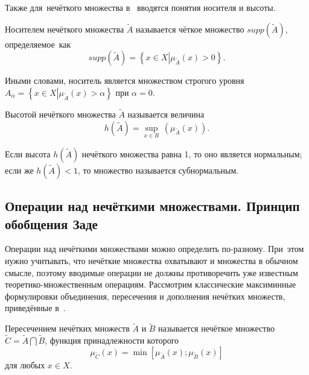 Также для~нечёткого множества в~\cite{Pospelov, Rutkovskaya, Yakhyaeva} вводятся понятия носителя и высоты.
\begin{mydef}
Носителем нечёткого множества $\tilde{A}$ называется чёткое множество $supp\left( {\tilde{A}} \right)$, определяемое~как
\begin{equation}
\label{eq:support}
	supp\left( \tilde A \right)=\left\{ x\in X \left| \mu_{\tilde A}\left( x \right)>0 \right. \right\}.
\end{equation}
\end{mydef}
Иными словами, носитель является множеством строгого уровня $A_\alpha= \left\{ x\in X \left| \mu_{\tilde A}\left( x \right)> \alpha \right. \right\}$ при $\alpha = 0$.

\begin{mydef}
Высотой нечёткого множества $\tilde A$ называется величина
\begin{equation}
\label{eq:number-height}
	h \left( \tilde A \right)= \underset{x\in R}{\mathop {\sup}} {}\, \left( \mu_{\tilde A} \left( x \right) \right).
\end{equation}
\end{mydef}
Если высота $h\left( \tilde A \right)$ нечёткого множества равна 1, то оно является нормальным; если же $h\left( \tilde A \right) < 1$, то множество называется субнормальным.

\subsection{Операции над нечёткими множествами. Принцип обобщения Заде}

Операции над нечёткими множествами можно определить по-разному. При~этом нужно учитывать, что нечёткие множества охватывают и множества в обычном смысле, поэтому вводимые операции не должны противоречить уже известным теоретико-множественным операциям. Рассмотрим классические максиминные формулировки объединения, пересечения и дополнения нечётких множеств, приведённые в~\cite{Rutkovskaya, Orlovskiy, Borisov_Alexeev_Msk, Borisov_Krumberg_Riga, Kaufmann}.

\begin{mydef}
Пересечением нечётких множеств $\tilde{A}$ и $\tilde{B}$ называется нечёткое множество $\displaystyle \tilde{C}=\tilde{A}\bigcap \tilde{B}$, функция принадлежности которого
\begin{equation}
\label{eq:fuzzy-cross}
	{{\mu }_{{\tilde{C}}}}\left( x \right)=\min \left[ {{\mu }_{{\tilde{A}}}}\left( x \right);{{\mu }_{{\tilde{B}}}}\left( x \right) \right]
\end{equation}
для любых $x\in X$.
\end{mydef}

